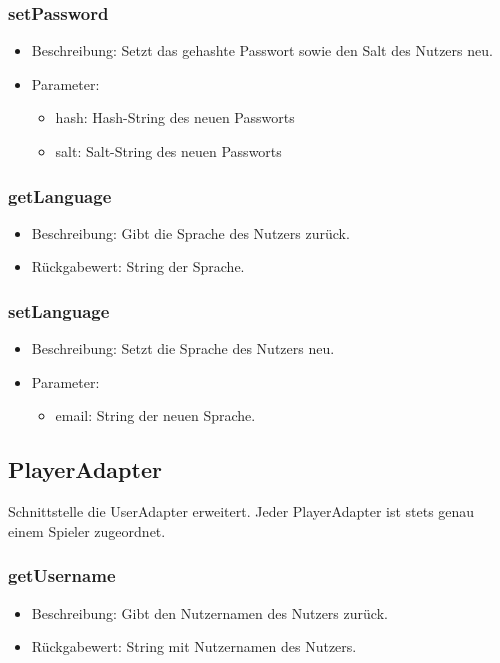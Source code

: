 \documentclass[a4paper]{scrreprt}
\begin{document}
    \subsubsection{setPassword}
    \begin{itemize}
        \item Beschreibung: Setzt das gehashte Passwort sowie den Salt des Nutzers neu.
        \item Parameter:
        \begin{itemize}
            \item hash: Hash-String des neuen Passworts
            \item salt: Salt-String des neuen Passworts
        \end{itemize}
    \end{itemize}

    \subsubsection{getLanguage}
    \begin{itemize}
        \item Beschreibung: Gibt die Sprache des Nutzers zurück.
        \item Rückgabewert: String der Sprache.
    \end{itemize}

    \subsubsection{setLanguage}
    \begin{itemize}
        \item Beschreibung: Setzt die Sprache des Nutzers neu.
        \item Parameter:
        \begin{itemize}
            \item email: String der neuen Sprache.
        \end{itemize}
    \end{itemize}

    \subsection{PlayerAdapter}
    Schnittstelle die UserAdapter erweitert.
    Jeder PlayerAdapter ist stets genau einem Spieler zugeordnet.

    \subsubsection{getUsername}
    \begin{itemize}
        \item Beschreibung: Gibt den Nutzernamen des Nutzers zurück.
        \item Rückgabewert: String mit Nutzernamen des Nutzers.
    \end{itemize}
\end{document}
